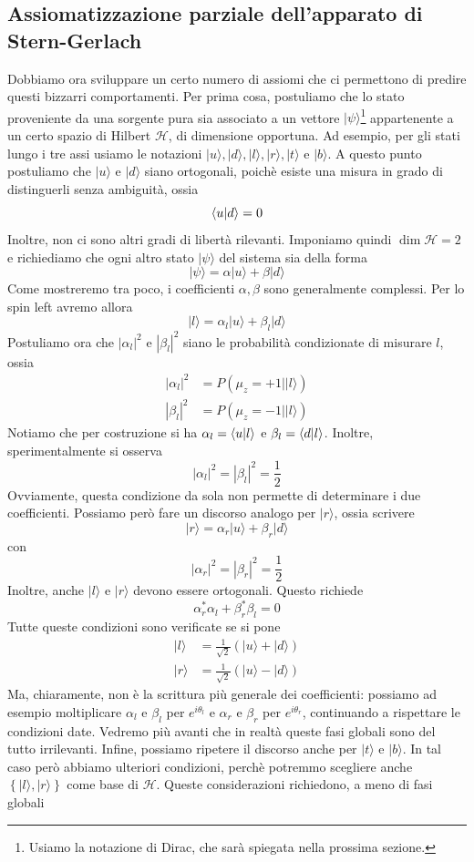 \documentclass[a4paper, 11pt]{article}
\renewcommand{\H}{\mathcal{H}}
\renewcommand{\ket}[1]{| #1\rangle}
\begin{document}
	\subsection{Assiomatizzazione parziale dell'apparato di Stern-Gerlach}
	Dobbiamo ora sviluppare un certo numero di assiomi che ci permettono di predire questi bizzarri comportamenti. Per prima cosa, postuliamo che lo stato proveniente da una sorgente pura sia associato a un vettore $\ket{\psi}$\footnote{Usiamo la notazione di Dirac, che sarà spiegata nella prossima sezione.} appartenente a un certo spazio di Hilbert $\H$, di dimensione opportuna. Ad esempio, per gli stati lungo i tre assi usiamo le notazioni $\ket{u},\ket{d},\ket{l},\ket{r},\ket{t}$ e $\ket{b}$. A questo punto postuliamo che $\ket{u}$ e $\ket{d}$ siano ortogonali, poichè esiste una misura in grado di distinguerli senza ambiguità, ossia
	\[\langle u\vert d\rangle=0\]
	Inoltre, non ci sono altri gradi di libertà rilevanti. Imponiamo quindi $\dim\H=2$ e richiediamo che ogni altro stato $\ket{\psi}$ del sistema sia della forma
	\[\ket{\psi}=\alpha\ket{u}+\beta\ket{d}\]
	Come mostreremo tra poco, i coefficienti $\alpha,\beta$ sono generalmente complessi. Per lo spin left avremo allora
	\[\ket{l}=\alpha_l\ket{u}+\beta_l\ket{d}\]
	Postuliamo ora che $|\alpha_l|^2$ e $|\beta_l|^2$ siano le probabilità condizionate di misurare $l$, ossia
	\begin{align*}
	|\alpha_l|^2&=P(\mu_z=+1\vert\ket{l})\\
	|\beta_l|^2&=P(\mu_z=-1\vert\ket{l})
	\end{align*}
	Notiamo che per costruzione si ha $\alpha_l=\langle u\vert l\rangle$ e $\beta_l=\langle d\vert l\rangle$. Inoltre, sperimentalmente si osserva
	\[|\alpha_l|^2=|\beta_l|^2=\frac{1}{2}\]
	Ovviamente, questa condizione da sola non permette di determinare i due coefficienti. Possiamo però fare un discorso analogo per $\ket{r}$, ossia scrivere
	\[\ket{r}=\alpha_r\ket{u}+\beta_r\ket{d}\]
	con
	\[|\alpha_r|^2=|\beta_r|^2=\frac{1}{2}\]
	Inoltre, anche $\ket{l}$ e $\ket{r}$ devono essere ortogonali. Questo richiede
	\[\alpha^*_r\alpha_l+\beta^*_r\beta_l=0\]
	Tutte queste condizioni sono verificate se si pone
	\begin{align*}
		\ket{l}&=\frac{1}{\sqrt{2}}\left(\ket{u}+\ket{d}\right)\\
		\ket{r}&=\frac{1}{\sqrt{2}}\left(\ket{u}-\ket{d}\right)
	\end{align*}
	Ma, chiaramente, non è la scrittura più generale dei coefficienti: possiamo ad esempio moltiplicare $\alpha_l$ e $\beta_l$ per $e^{i\theta_l}$ e $\alpha_r$ e $\beta_r$ per $e^{i\theta_r}$, continuando a rispettare le condizioni date. Vedremo più avanti che in realtà queste fasi globali sono del tutto irrilevanti. Infine, possiamo ripetere il discorso anche per $\ket{t}$ e $\ket{b}$. In tal caso però abbiamo ulteriori condizioni, perchè potremmo scegliere anche $\left\{\ket{l},\ket{r}\right\}$ come base di $\H$. Queste considerazioni richiedono, a meno di fasi globali
\end{document}
